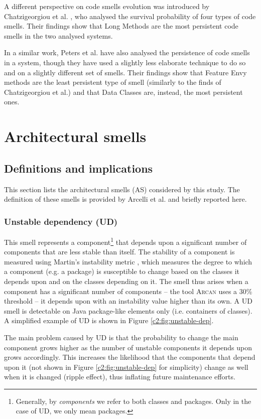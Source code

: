 A different perspective on code smells evolution was introduced by Chatzigeorgiou et al. \cite{Chatzigeorgiou2014}, who analysed the survival probability of four types of code smells. Their findings show that Long Methods are the most persistent code smells in the two analysed systems.

In a similar work, Peters et al. \cite{Peters2012} have also analysed the persistence of code smells in a system, though they have used a slightly less elaborate technique to do so and on a slightly different set of smells.
Their findings show that Feature Envy methods are the least persistent type of smell (similarly to the finds of Chatzigeorgiou et al.) and that Data Classes are, instead, the most persistent ones.

\section{Architectural smells}\label{c2:sec:arch-smells}
\subsection{Definitions and implications}
This section lists the architectural smells (AS) considered by this study. The definition of these smells is provided by Arcelli et al. \cite{Arcelli2016} and briefly reported here.
\subsubsection{Unstable dependency (UD)}\label{c2:sec:arch-smells-ud}
This smell represents a component\footnote{Generally, by \emph{components} we refer to both classes and packages. Only in the case of UD, we only mean packages.} that depends upon a significant number of components that are less stable than itself.
The stability of a component is measured using Martin's instability metric \cite{Martin2018}, which measures the degree to which a component (e.g. a package) is susceptible to change based on the classes it depends upon and on the classes depending on it.
The smell thus arises when a component has a significant number of components -- the tool \textsc{Arcan} uses a 30\% threshold \cite{Arcelli2017} -- it depends upon with an instability value higher than its own.
A UD smell is detectable on Java package-like elements only (i.e. containers of classes). A simplified example of UD is shown in Figure \ref{c2:fig:unstable-dep}. 

The main problem caused by UD is that the probability to change the main component grows higher as the number of unstable components it depends upon grows accordingly. This increases the likelihood that the components that depend upon it (not shown in Figure \ref{c2:fig:unstable-dep} for simplicity) change as well when it is changed (ripple effect), thus inflating future maintenance efforts.

